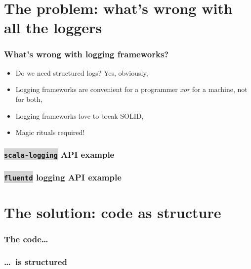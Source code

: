 \documentclass[usenames,dvipsnames]{beamer}
\newcommand{\code}[1]{\colorbox{lightgray}{\texttt{#1}}}
\begin{document}
\begin{frame}
\titlepage
\end{frame}

\section{The problem: what's wrong with all the loggers}

\begin{frame}
\frametitle{What's wrong with logging frameworks?}

\begin{itemize}
\item Do we need structured logs? Yes, obviously,
\item Logging frameworks are convenient for a programmer \textit{xor} for a machine, not for both,
\item Logging frameworks love to break SOLID,
\item Magic rituals required!
\end{itemize}
\end{frame}

\begin{frame}
\frametitle{\code{scala-logging} API example}
\end{frame}

\begin{frame}
\frametitle{\code{fluentd} logging API example}
\end{frame}

\section{The solution: code as structure}
\begin{frame}
\frametitle{The code\dots}
\end{frame}

\begin{frame}
\frametitle{\dots~is structured}
\end{frame}
\end{document}
